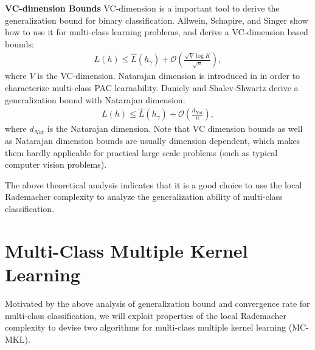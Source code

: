 \documentclass{article}
\begin{document}
\textbf{VC-dimension Bounds}
VC-dimension is a important tool to derive the generalization bound for binary classification.
Allwein, Schapire, and Singer  show how to use it
for multi-class learning problems,
and derive a VC-dimension based bounds:
\begin{align*}
   L(h)\leq  \hat{L}(h_\gamma) +\mathcal{O}\left(\frac{\sqrt{V}\log K}{\sqrt{n}}\right),
\end{align*}
where $V$ is the VC-dimension.
Natarajan dimension is introduced in \cite{Natarajan1989} in
order to characterize multi-class PAC learnability.
Daniely and Shalev-Shwartz  derive a generalization bound with Natarajan dimension:
\begin{align*}
   L(h)\leq  \hat{L}(h_\gamma) +\mathcal{O}\left(\frac{d_{Nat}}{n}\right),
\end{align*}
where $d_{Nat}$ is the Natarajan dimension.
Note that VC dimension bounds as well as Natarajan dimension bounds are usually dimension
dependent, which makes them hardly applicable for practical large
scale problems (such as typical computer vision problems).

The above theoretical analysis indicates that it is a good
choice to use the local Rademacher complexity to analyze the generalization
ability of multi-class classification.

\section{Multi-Class Multiple Kernel Learning}
Motivated by the above analysis of generalization bound and convergence rate for multi-class classification,
we will exploit properties of the local Rademacher complexity
to devise two algorithms for multi-class multiple kernel learning (MC-MKL).
\end{document}
